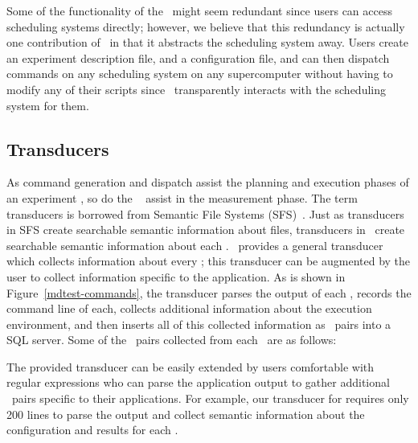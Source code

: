 Some of the functionality of the \dispatcher\ might seem redundant since users
can access scheduling systems directly; however, we believe that this
redundancy is actually one contribution of \name\ in that it abstracts the
scheduling system away.  Users create an experiment description file, and a
configuration file, and can then dispatch commands on any scheduling system on
any supercomputer without having to modify any of their scripts
since \name\ transparently interacts with the scheduling system for them.

\subsection{Transducers}

As command generation and dispatch assist the planning and execution phases of
an experiment \lifecycle, so do the \name\  assist in the
measurement phase.  The term transducers is borrowed from Semantic File Systems
(SFS)~\cite{gifford-sfs}.  Just as transducers in SFS create searchable
semantic information about files, transducers in \name\ create searchable
semantic information about each \sub.  \name\ provides a general transducer
which collects information about every \sub; this transducer can be augmented
by the user to collect information specific to the application.  As is shown in
Figure~\ref{mdtest-commands}, the transducer parses the output of each \sub,
records the command line of each, collects additional information about the
execution environment, and then inserts all of this collected information as
\kv\ pairs into a SQL server.  Some of the \kv\ pairs collected from each \sub\
are as follows:

\begin{quote}
\begin{itemize}
\end{itemize}
\end{quote}

The provided transducer can be easily extended by users comfortable with
regular expressions who can parse the application output to gather additional
\kv\ pairs specific to their applications.  For example, our transducer for
\Term{mdtest} requires only 200 lines to parse the output and collect
semantic information about the configuration and results for each \sub. 

